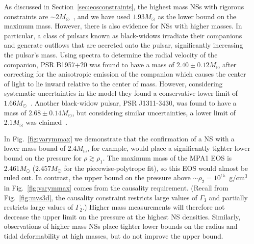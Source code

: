 \documentclass[twocolumn,prd,amssymb,aps,nofootinbib,showpacs,epsf]{revtex4}
\begin{document}
As discussed in Section~\ref{sec:eosconstraints}, the highest mass NSs with rigorous constraints are $\sim 2M_\odot$~\cite{DemorestPennucciRansom2010, AntoniadisFreireWex2013}, and we have used $1.93M_\odot$ as the lower bound on the maximum mass. However, there is also evidence for NSs with higher masses. In particular, a class of pulsars known as black-widows irradiate their companions and generate outflows that are accreted onto the pulsar, significantly increasing the pulsar's mass. Using spectra to determine the radial velocity of the companion, PSR B1957+20 was found to have a mass of $2.40\pm0.12M_\odot$ after correcting for the anisotropic emission of the companion which causes the center of light to lie inward relative to the center of mass. However, considering systematic uncertainties in the model they found a conservative lower limit of $1.66M_\odot$~\cite{VanKerkwijkBretonKulkarni2011}. Another black-widow pulsar, PSR J1311-3430, was found to have a mass of $2.68\pm0.14M_\odot$, but considering similar uncertainties, a lower limit of $2.1M_\odot$ was claimed~\cite{RomaniFilippenkoSilverman2012}. 

In Fig.~\ref{fig:varymmax} we demonstrate that the confirmation of a NS with a lower mass bound of $2.4M_\odot$, for example, would place a significantly tighter lower bound on the pressure for $\rho \gtrsim \rho_1$. The maximum mass of the MPA1 EOS is $2.461M_\odot$ ($2.457M_\odot$ for the piecewise-polytrope fit), so this EOS would almost be ruled out. In contrast, the upper bound on the pressure above $\sim\rho_2=10^{15}$~g/cm$^3$ in Fig.~\ref{fig:varymmax} comes from the causality requirement. (Recall from Fig.~\ref{fig:mvs3d}, the causality constraint restricts large values of $\Gamma_3$ and partially restricts large values of $\Gamma_2$.) Higher mass measurements will therefore not decrease the upper limit on the pressure at the highest NS densities. Similarly, observations of higher mass NSs place tighter lower bounds on the radius and tidal deformability at high masses, but do not improve the upper bound.
\end{document}
